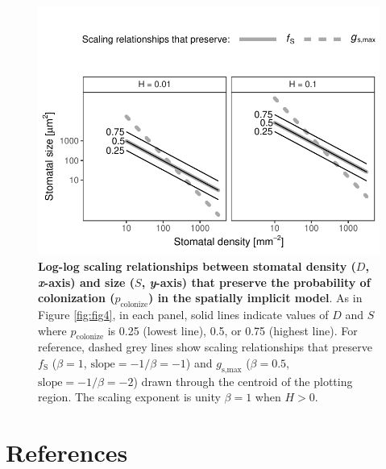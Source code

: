 \documentclass[utf8]{frontiersSCNS}
\newcommand{\fs}{$f_\text{S}$}
\newcommand{\gsmax}{$g_\text{s,max}$}
\begin{document}
\begin{figure}
  \centering
    \includegraphics{../figures/figS3.pdf}
    \caption{\textbf{Log-log scaling relationships between stomatal density ($D$, \textit{x}-axis) and size ($S$, \textit{y}-axis) that preserve the probability of colonization ($p_\text{colonize}$) in the spatially implicit model}. As in Figure \ref{fig:fig4}, in each panel, solid lines indicate values of $D$ and $S$ where $p_\text{colonize}$ is 0.25 (lowest line), 0.5, or 0.75 (highest line). For reference, dashed grey lines show scaling relationships that preserve \fs{} ($\beta = 1$, $\text{slope} = - 1 / \beta = -1$) and \gsmax{} ($\beta = 0.5$, $\text{slope} = - 1 / \beta = -2$) drawn through the centroid of the plotting region. The scaling exponent is unity $\beta = 1$ when $H > 0$.}
    \label{fig:figS3}
\end{figure}

\clearpage

\hypertarget{references}{%
\section*{References}\label{references}}
\end{document}
